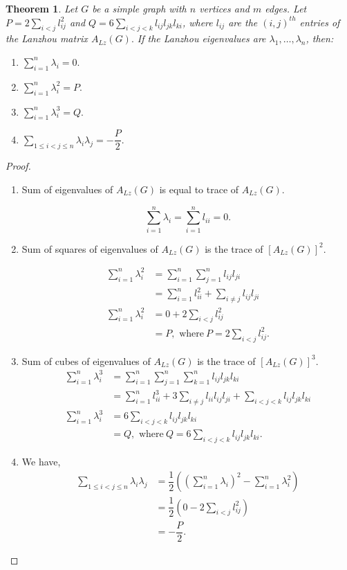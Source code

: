 \documentclass[10pt,a4paper,oneside]{article}
\newtheorem{theorem}{Theorem}
\begin{document}
\begin{theorem}
Let $G$ be a simple graph with $n$ vertices and $m$ edges. Let $P = 2 \sum\limits_{i<j} l_{ij}^2$ and $Q = 6 \sum\limits_{i<j<k} l_{ij}l_{jk}l_{ki}$, where $l_{ij}$ are the $(i,j)^{th}$ entries of the Lanzhou matrix $A_{Lz}(G).$ If the Lanzhou eigenvalues are $\lambda_1, \ldots, \lambda_n$, then:
\begin{enumerate}
\item $\sum\limits_{i=1}^{n} \lambda_i =0.$
\item $\sum\limits_{i=1}^{n} \lambda_i^2 = P.$
\item $\sum\limits_{i=1}^{n} \lambda_i^3 = Q.$
\item $\sum\limits_{1\leq i<j\leq n} \lambda_i\lambda_j = -\dfrac{P}{2}.$
\end{enumerate}
\end{theorem}
\begin{proof}
\begin{enumerate}
\item Sum of eigenvalues of $A_{Lz}(G)$ is equal to trace of $A_{Lz}(G).$
		
$$\sum \limits_{i=1}^{n} \lambda_i=\sum \limits_{i=1}^{n} l_{ii}=0.$$
		
\item Sum of squares of eigenvalues of $A_{Lz}(G)$ is the trace of $[A_{Lz}(G)]^2.$
		
\begin{align*}
\sum \limits_{i=1}^{n} \lambda_i^2&=\sum \limits_{i=1}^{n} \sum \limits_{j=1}^{n} l_{ij}l_{ji}\\&=\sum \limits_{i=1}^{n}l^2_{ii}+\sum \limits_{i\neq j} l_{ij}l_{ji}\\\sum \limits_{i=1}^{n} \lambda_i^2&=0 +2 \sum \limits_{i< j}l_{ij}^2\\&=P, \text{\ where}\ P = 2 \sum_{i<j} l_{ij}^2.
\end{align*}
	 
		
\item Sum of cubes of eigenvalues of $A_{Lz}(G)$ is the trace of $[A_{Lz}(G)]^3.$
\begin{align*}
\sum \limits_{i=1}^{n} \lambda_i^3&=\sum \limits_{i=1}^{n} \sum \limits_{j=1}^{n} \sum \limits_{k=1}^{n} l_{ij}l_{jk}l_{ki}\\&=\sum \limits_{i=1}^{n}l^3_{ii}+3\sum \limits_{i\neq j} l_{ii} l_{ij}l_{ji}+\sum\limits_{i<j<k}l_{ij}l_{jk}l_{ki}\\\sum \limits_{i=1}^{n} \lambda_i^3&=6 \sum \limits_{i< j<k}l_{ij}l_{jk}l_{ki}\\&=Q, \text{\ where}\ Q = 6 \sum_{i<j<k} l_{ij}l_{jk}l_{ki}.
\end{align*}
		 
\item We have, \begin{align*}
\sum\limits_{1\leq i<j\leq n} \lambda_i\lambda_j&=\dfrac{1}{2}\left(\left(\sum\limits_{i=1}^{n}\lambda_i\right)^2- \sum\limits_{i=1}^{n}\lambda_i ^2\right)\\&=\dfrac{1}{2}\left( 0-2 \sum \limits_{i< j}l_{ij}^2\right)\\&=-\dfrac{P}{2}.
\end{align*}
\end{enumerate}
\end{proof}
\end{document}
